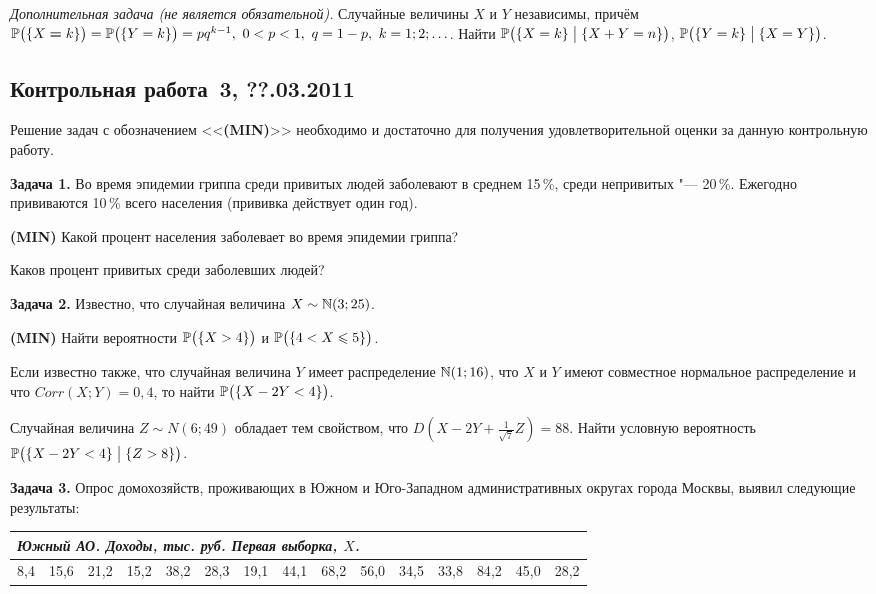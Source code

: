 \documentclass[pdftex,12pt,a4paper]{article}
\newenvironment{enumerate*}{
\begin{enumerate}
  \setlength{\itemsep}{0pt}
  \setlength{\parskip}{0pt}
  \setlength{\parsep}{0pt}
}{\end{enumerate}}
\newcommand{\MIN}{\textbf{(MIN)}{}}
\begin{document}
\emph{Дополнительная задача (не является обязательной).} Случайные величины $X$ и $Y$ независимы, причём $\mathbb{P}\bigl(\{X\hm=k\}\bigr)=\mathbb{P}\bigl(\{Y=k\}\bigr)=pq^{k-1},\ 0<p<1,\ q=1-p,\ k=1;2;\ldots$. Найти $\mathbb{P}\bigl(\{X=k\} \bigm| \{X+Y=n\}\bigr)$, $\mathbb{P}\bigl(\{Y=k\}\bigm| \{X=Y\}\bigr)$.

\subsection{Контрольная работа \No\,3, ??.03.2011}

Решение задач с обозначением <<\MIN{}>> необходимо и достаточно для получения удовлетворительной оценки за данную контрольную работу.\par\smallskip

\textbf{Задача 1.} Во время эпидемии гриппа среди привитых людей заболевают в среднем 15\,\%, среди непривитых "--- 20\,\%. Ежегодно прививаются 10\,\% всего населения (прививка действует один год).
\begin{enumerate*}
\item \MIN{} Какой процент населения заболевает во время эпидемии гриппа?
\item Каков процент привитых среди заболевших людей?
\end{enumerate*}

\textbf{Задача 2.} Известно, что случайная величина $X\sim\N(3;25)$.
\begin{enumerate*}
\item \MIN{} Найти вероятности $\P\bigl(\{X>4\}\bigr)$ и $\P\bigl(\{4<X\leqslant 5\}\bigr)$.
\item Если известно также, что случайная величина $Y$ имеет распределение $\N(1;16)$, что $X$ и $Y$ имеют совместное нормальное распределение и что $Corr(X;Y)=0{,}4$, то найти $\P\bigl(\{X-2Y<4\}\bigr)$.
\item Случайная величина $Z\sim N(6;49)$ обладает тем свойством, что $D\left(X-2Y+\frac{1}{\sqrt{7}}Z\right)=88$. Найти условную вероятность $\P\bigl(\{X-2Y<4\} \bigm| \{Z>8\}\bigr)$.
\end{enumerate*}

\textbf{Задача 3.} Опрос домохозяйств, проживающих в Южном и Юго-Западном административных округах города Москвы, выявил следующие результаты:
\par\smallskip
\begin{tabular}{|p{6mm}|p{6mm}|p{6mm}|p{6mm}|p{6mm}|p{6mm}|p{6mm}|p{6mm}|p{6mm}|p{6mm}|p{6mm}|p{6mm}|p{6mm}|p{6mm}|p{6mm}|}
\multicolumn{15}{l}{\emph{Южный АО. Доходы, тыс. руб. Первая выборка, $X$.}}\\ \hline
8{,}4 & 15{,}6 & 21{,}2 & 15{,}2 & 38{,}2 & 28{,}3 & 19{,}1 & 44{,}1 & 68{,}2 & 56{,}0 & 34{,}5 & 33{,}8 & 84{,}2 & 45{,}0 & 28{,}2 \\ \hline
\end{tabular}\par\smallskip
\end{document}
